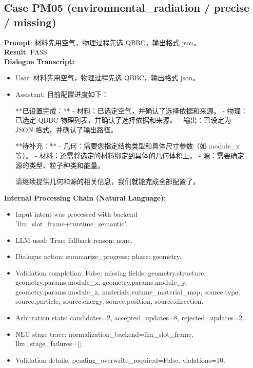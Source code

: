 \documentclass[11pt]{ctexart}
\begin{document}
\subsection{Case PM05 (environmental\_radiation / precise / missing)}
\textbf{Prompt}: 材料先用空气，物理过程先选 QBBC，输出格式 json。\\
\textbf{Result}: PASS\\
\textbf{Dialogue Transcript:}
\begin{itemize}
\item User: 材料先用空气，物理过程先选 QBBC，输出格式 json。
\item Assistant: 目前配置进度如下：

**已设置完成：**
- 材料：已选定空气，并确认了选择依据和来源。
- 物理：已选定 QBBC 物理列表，并确认了选择依据和来源。
- 输出：已设定为 JSON 格式，并确认了输出路径。

**待补充：**
- 几何：需要您指定结构类型和具体尺寸参数（如 module\_x 等）。
- 材料：还需将选定的材料绑定到具体的几何体积上。
- 源：需要确定源的类型、粒子种类和能量。

请继续提供几何和源的相关信息，我们就能完成全部配置了。
\end{itemize}
\textbf{Internal Processing Chain (Natural Language):}
\begin{itemize}
\item Input intent was processed with backend 'llm\_slot\_frame+runtime\_semantic'.
\item LLM used: True; fallback reason: none.
\item Dialogue action: summarize\_progress; phase: geometry.
\item Validation completion: False; missing fields: geometry.structure, geometry.params.module\_x, geometry.params.module\_y, geometry.params.module\_z, materials.volume\_material\_map, source.type, source.particle, source.energy, source.position, source.direction.
\item Arbitration stats: candidates=2, accepted\_updates=8, rejected\_updates=2.
\item NLU stage trace: normalization\_backend=llm\_slot\_frame, llm\_stage\_failures=[].
\item Validation details: pending\_overwrite\_required=False, violations=10.
\end{itemize}
\end{document}

